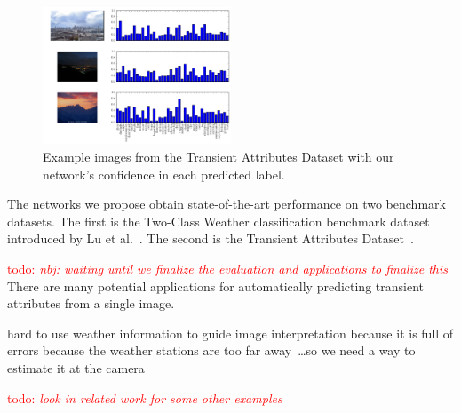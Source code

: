 \documentclass{article}
\newcommand{\todo}[1]{\textcolor{red}{todo: {\em #1}}}
\begin{document}
\begin{figure}
	\centering
		\includegraphics[width=0.5\textwidth]{figs/bars.pdf}
		\caption{Example images from the Transient Attributes Dataset
      with our network's confidence in each predicted label.}
    \label{fig:results}
\end{figure}


The networks we propose obtain state-of-the-art performance on two
benchmark datasets. The first is the Two-Class Weather classification
benchmark dataset introduced by Lu et al.~\cite{lutwoclass}. The
second is the Transient Attributes Dataset~\cite{Laffont14}. 


\todo{nbj: waiting until we finalize the evaluation and applications
to finalize this} There are many potential applications for
automatically predicting transient attributes from a single image. 

hard to use weather information to guide image
interpretation because it is full of errors because the weather
stations are too far away~\cite{islam13webcamweather}\dots so we need
a way to estimate it at the camera

\todo{look in related work for some other examples}
\end{document}
